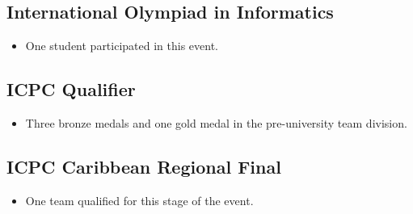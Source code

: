 \subsection{International Olympiad in Informatics}

\begin{itemize}
	\item One student participated in this event.
\end{itemize}

\subsection{ICPC Qualifier}

\begin{itemize}
	\item Three bronze medals and one gold medal in the pre-university team division.
\end{itemize}

\subsection{ICPC Caribbean Regional Final}

\begin{itemize}
	\item One team qualified for this stage of the event.
\end{itemize}